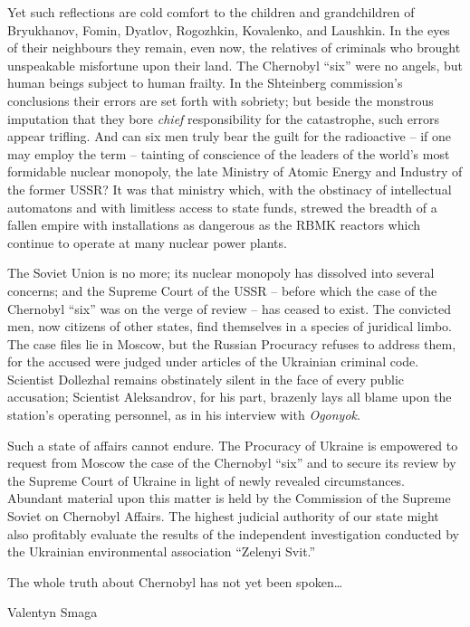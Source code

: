 \documentclass[openright]{bookest}
\begin{document}
Yet such reflections are cold comfort to the children and grandchildren of Bryukhanov, Fomin, Dyatlov, Rogozhkin, Kovalenko, and Laushkin. In the eyes of their neighbours they remain, even now, the relatives of criminals who brought unspeakable misfortune upon their land. The Chernobyl ``six'' were no angels, but human beings subject to human frailty. In the Shteinberg commission's conclusions their errors are set forth with sobriety; but beside the monstrous imputation that they bore \textit{chief} responsibility for the catastrophe, such errors appear trifling. And can six men truly bear the guilt for the radioactive -- if one may employ the term -- tainting of conscience of the leaders of the world's most formidable nuclear monopoly, the late Ministry of Atomic Energy and Industry of the former USSR? It was that ministry which, with the obstinacy of intellectual automatons and with limitless access to state funds, strewed the breadth of a fallen empire with installations as dangerous as the RBMK reactors which continue to operate at many nuclear power plants.

The Soviet Union is no more; its nuclear monopoly has dissolved into several concerns; and the Supreme Court of the USSR -- before which the case of the Chernobyl ``six'' was on the verge of review -- has ceased to exist. The convicted men, now citizens of other states, find themselves in a species of juridical limbo. The case files lie in Moscow, but the Russian Procuracy refuses to address them, for the accused were judged under articles of the Ukrainian criminal code. Scientist Dollezhal remains obstinately silent in the face of every public accusation; Scientist Aleksandrov, for his part, brazenly lays all blame upon the station's operating personnel, as in his interview with \textit{Ogonyok}.

Such a state of affairs cannot endure. The Procuracy of Ukraine is empowered to request from Moscow the case of the Chernobyl ``six'' and to secure its review by the Supreme Court of Ukraine in light of newly revealed circumstances. Abundant material upon this matter is held by the Commission of the Supreme Soviet on Chernobyl Affairs. The highest judicial authority of our state might also profitably evaluate the results of the independent investigation conducted by the Ukrainian environmental association ``Zelenyi Svit.''

The whole truth about Chernobyl has not yet been spoken\ldots

\begin{flushright}
Valentyn Smaga
\end{flushright}
\end{document}
